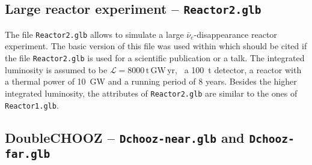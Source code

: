 \begin{appendix}
\subsection*{Large reactor experiment -- {\tt Reactor2.glb}}

The file {\tt Reactor2.glb} allows to simulate a large $\bar{\nu}_e$-disappearance reactor experiment. The basic
version of this file was used within \cite{Huber:2003pm} which should be cited if the file {\tt Reactor2.glb} is
used for a scientific publication or a talk. The integrated luminosity is assumed to be
$\mathrm{\mathcal{L} = 8000 \,t \, GW\, yr}$, \eg\ a 100~t detector, a reactor with a thermal power of 10~GW
and a running period of 8 years. Besides the higher integrated luminosity, the attributes of {\tt Reactor2.glb}
are similar to the ones of {\tt Reactor1.glb}.

\subsection*{DoubleCHOOZ -- {\tt Dchooz-near.glb} and {\tt Dchooz-far.glb}}


\end{appendix}
